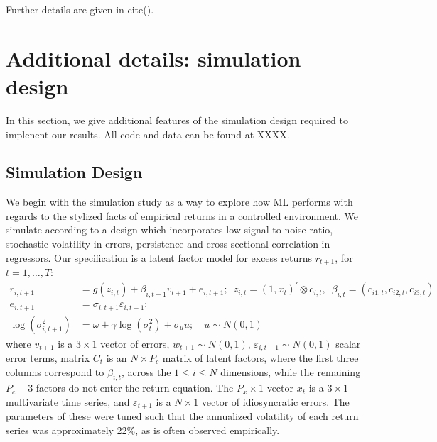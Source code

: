 \documentclass{article}
\begin{document}
Further details are given in cite().

\newpage

\section{Additional details: simulation design}
In this section, we give additional features of the simulation design required to implenent our results. All code and data can be found at XXXX. 

\subsection{Simulation Design}\label{app:simDesign}

We begin with the simulation study as a way to explore how ML performs with regards to the stylized facts of empirical returns in a controlled environment. We simulate according to a design which incorporates low signal to noise ratio, stochastic volatility in errors, persistence and cross sectional correlation in regressors. Our specification is a latent factor model for excess returns $r_{t+1}$, for $t=1, \dots, T$:
\begin{align}
r_{i, t+1} &= 
g\left(z_{i, t}\right) + \beta_{i,t+1}v_{t+1} + e_{i, t+1}; 
\enspace z_{i, t} = \left(1, x_{t}\right)^{\prime} \otimes c_{i, t}, 
\enspace \beta_{i, t} = \left(c_{i 1, t}, c_{i 2, t}, c_{i 3, t}\right) \\ 
e_{i, t+1} &= 
\sigma_{i, t+1} \varepsilon_{i, t+1}; \\
\operatorname{log} (\sigma^2_{i,t+1}) &= 
\omega + \gamma \operatorname{log} (\sigma^2_{t}) + \sigma_{u}u;
\quad u \sim N(0, 1)
\end{align}
where $v_{t+1}$ is a $3\times 1$ vector of errors, $w_{t+1} \sim N(0, 1)$,  $\varepsilon_{i,t+1} \sim N(0, 1)$ scalar error terms, matrix $C_t$ is an $N\times P_c$ matrix of latent factors, where the first three columns correspond to $\beta_{i,t}$, across the $1\leq i\leq N$ dimensions, while the remaining $P_c-3$ factors do not enter the return equation. The $P_x\times1$ vector $x_t$ is a $3 \times 1$ multivariate time series, and $\varepsilon_{t+1}$ is a $N\times 1$ vector of idiosyncratic errors. The parameters of these were tuned such that the annualized volatility of each return series was approximately 22\%, as is often observed empirically.
\end{document}
